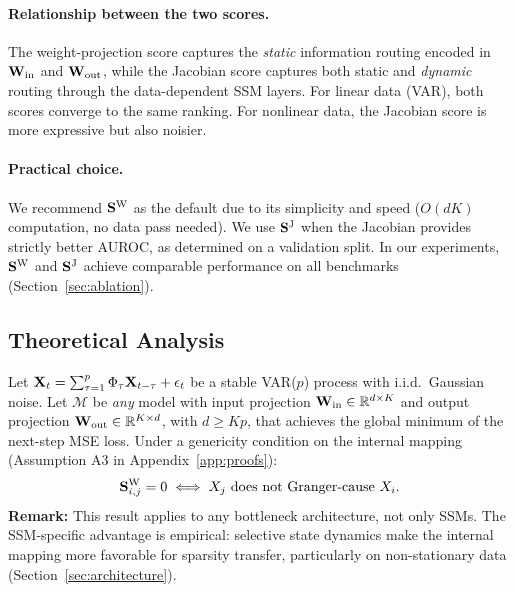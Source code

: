 \paragraph{Relationship between the two scores.}
The weight-projection score captures the \emph{static} information routing
encoded in $\mathbf{W}_{\text{in}}$ and $\mathbf{W}_{\text{out}}$, while the Jacobian
score captures both static and \emph{dynamic} routing through the
data-dependent SSM layers. For linear data (VAR), both scores converge to
the same ranking. For nonlinear data, the Jacobian score is more
expressive but also noisier.

\paragraph{Practical choice.} We recommend $\mathbf{S}^{\text{W}}$ as the default
due to its simplicity and speed ($O(dK)$ computation, no data pass needed).
We use $\mathbf{S}^{\text{J}}$ when the Jacobian provides strictly better
AUROC, as determined on a validation split. In our experiments,
$\mathbf{S}^{\text{W}}$ and $\mathbf{S}^{\text{J}}$ achieve comparable performance on
all benchmarks (Section~\ref{sec:ablation}).

\subsection{Theoretical Analysis}

\begin{proposition}
\label{thm:var_recovery}
Let $\mathbf{X}_t = \sum_{\tau=1}^{p} \Phi_\tau \mathbf{X}_{t-\tau} + \epsilon_t$ be
a stable VAR($p$) process with i.i.d.\ Gaussian noise. Let $\mathcal{M}$
be \emph{any} model with input projection $\mathbf{W}_{\text{in}} \in \mathbb{R}^{d
\times K}$ and output projection $\mathbf{W}_{\text{out}} \in \mathbb{R}^{K \times d}$,
with $d \geq Kp$, that achieves the global minimum of the next-step MSE
loss. Under a genericity condition on the internal mapping (Assumption A3
in Appendix~\ref{app:proofs}):
\begin{equation}
    \mathbf{S}^{\text{W}}_{i,j} = 0 \iff X_j \text{ does not Granger-cause } X_i.
\end{equation}
\textbf{Remark:} This result applies to any bottleneck architecture,
not only SSMs. The SSM-specific advantage is empirical: selective state
dynamics make the internal mapping more favorable for sparsity transfer,
particularly on non-stationary data (Section~\ref{sec:architecture}).
\end{proposition}

